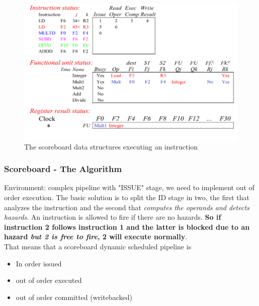 \documentclass[10pt,a4paper]{article}
\begin{document}
			 		\begin{figure}[H]
						\centering
						\includegraphics[width = \textwidth]{./images/Scoreboard2.png}
						\caption{The scoreboard data structures executing an instruction}
					\end{figure}
			
			\subsubsection{Scoreboard - The Algorithm}
				Environment: complex pipeline with "ISSUE" stage, we need to implement out of order execution. The basic solution is to split the ID stage in two, the first that analyzes the instruction and the second that \emph{computes the operands and detects hazards}. An instruction is allowed to fire if there are no hazards. \textbf{So if instruction 2 follows instruction 1 and the latter is blocked due to an hazard \emph{but 2 is free to fire}, 2 will execute normally}.\\
				That means that a scoreboard dynamic scheduled pipeline is
				\begin{itemize}
					\item In order issued
					\item out of order executed
					\item out of order committed (writebacked)
				\end{itemize}
				
\end{document}

